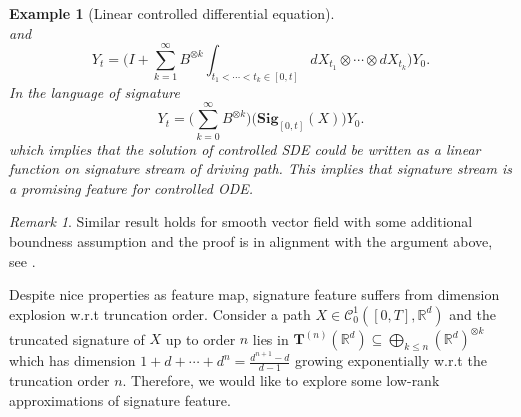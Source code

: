 \documentclass[12pt]{report}
\newtheorem{example}[theorem]{Example}
\theoremstyle{definition}
\theoremstyle{remark}
\newtheorem*{remark}{Remark}
\newcommand{\R}{\mathbb{R}}
\begin{document}
\begin{example}[Linear controlled differential equation]
\begin{equation}
  \end{equation}
  and
  \begin{equation} 
    Y_{t} = \Bigg(I + \sum_{k=1}^{\infty}B^{\otimes k}\int_{t_{1}<\cdots< t_{k} \in [0,t]}dX_{t_{1}}\otimes\cdots\otimes dX_{t_{k}}\Bigg) Y_{0}.
  \end{equation}
  In the language of signature 
  \begin{equation} 
    Y_{t} = \Big(\sum_{k=0}^{\infty}B^{\otimes k}\Big) \Big(\mathbf{Sig}_{[0,t]}(X)\Big) Y_{0}.
  \end{equation}
  which implies that the solution of controlled SDE could be written as a linear function on signature stream of driving path. This implies that signature stream is a promising feature for controlled ODE.
\end{example}
\begin{remark}
  Similar result holds for smooth vector field with some additional boundness assumption and the proof is in alignment with the argument above, see \cite{liao2019learning}. 
\end{remark}
Despite nice properties as feature map, signature feature suffers from dimension explosion w.r.t truncation order. Consider a path $X \in \mathcal{C}^{1}_{0}([0,T],\R^{d})$ and the truncated signature of $X$ up to order $n$ lies in $\mathbf{T}^{(n)}(\R^{d}) \subseteq \bigoplus_{k\leq n} (\R^{d})^{\otimes k} $ which has dimension $1 + d + \cdots + d^{n} = \frac{d^{n+1} - d}{d-1}$ growing exponentially w.r.t the truncation order $n$. Therefore, we would like to explore some low-rank approximations of signature feature. 
\end{document}
